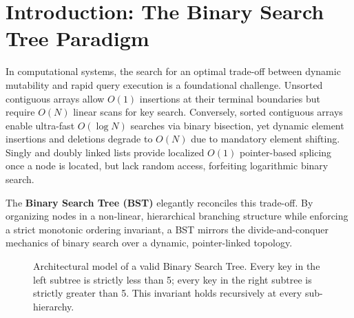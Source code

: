 \documentclass[10pt,journal,compsoc,onecolumn]{IEEEtran}
\begin{document}
\section{Introduction: The Binary Search Tree Paradigm}
\label{sec:intro}

In computational systems, the search for an optimal trade-off between dynamic mutability and rapid query execution is a foundational challenge. Unsorted contiguous arrays allow $O(1)$ insertions at their terminal boundaries but require $O(N)$ linear scans for key search. Conversely, sorted contiguous arrays enable ultra-fast $O(\log N)$ searches via binary bisection, yet dynamic element insertions and deletions degrade to $O(N)$ due to mandatory element shifting. Singly and doubly linked lists provide localized $O(1)$ pointer-based splicing once a node is located, but lack random access, forfeiting logarithmic binary search.

The \textbf{Binary Search Tree (BST)} elegantly reconciles this trade-off. By organizing nodes in a non-linear, hierarchical branching structure while enforcing a strict monotonic ordering invariant, a BST mirrors the divide-and-conquer mechanics of binary search over a dynamic, pointer-linked topology.

\begin{figure}[htbp]
\centering
{}
\caption{Architectural model of a valid Binary Search Tree. Every key in the left subtree is strictly less than 5; every key in the right subtree is strictly greater than 5. This invariant holds recursively at every sub-hierarchy.}
\label{fig:bst_valid_master}
\end{figure}
\end{document}

